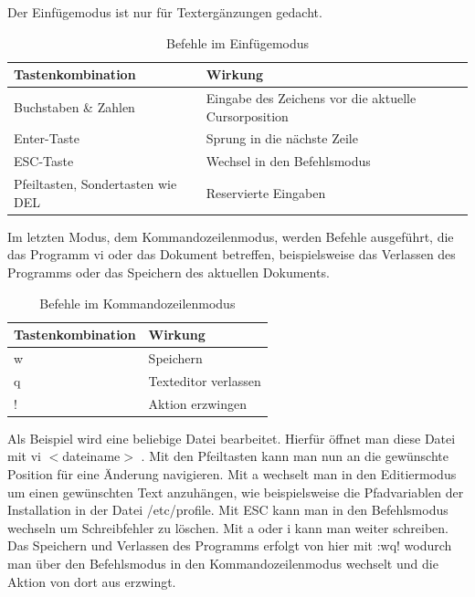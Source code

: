 \documentclass[12pt,a4paper]{article}
\begin{document}
Der Einfügemodus ist nur für Textergänzungen gedacht.

\begin{table} [H]
	\caption{Befehle im Einfügemodus}
	\label{tab:vi_einfuegemodus}
	\begin{tabularx}{\textwidth}{ | l | X | } 
		\hline
		Tastenkombination & Wirkung \\
		\hline \hline
		Buchstaben \& Zahlen & Eingabe des Zeichens vor die aktuelle Cursorposition \\ \hline
		Enter-Taste & Sprung in die nächste Zeile \\ \hline
		ESC-Taste & Wechsel in den Befehlsmodus \\ \hline
		Pfeiltasten, Sondertasten wie DEL & Reservierte Eingaben \\ \hline	
	\end{tabularx}
\end{table}

Im letzten Modus, dem Kommandozeilenmodus, werden Befehle ausgeführt, die das Programm vi oder das Dokument betreffen, beispielsweise das Verlassen des Programms oder das Speichern des aktuellen Dokuments.

\begin{table} [H]
	\caption{Befehle im Kommandozeilenmodus}
	\label{tab:vi_kommandozeilenmodus}
	\begin{tabularx}{\textwidth}{ | l | X | } 
		\hline
		Tastenkombination & Wirkung \\
		\hline \hline
		w & Speichern \\ \hline
		q & Texteditor verlassen \\ \hline
		! & Aktion erzwingen \\ \hline	
	\end{tabularx}
\end{table}

Als Beispiel wird eine beliebige Datei bearbeitet. Hierfür öffnet man diese Datei mit \glqq vi $<$dateiname$>$ \glqq{}. Mit den Pfeiltasten kann man nun an die gewünschte Position für eine Änderung navigieren. Mit \glqq a\grqq{} wechselt man in den Editiermodus um einen gewünschten Text anzuhängen, wie beispielsweise die Pfadvariablen der Installation in der Datei /etc/profile. Mit ESC kann man in den Befehlsmodus wechseln um Schreibfehler zu löschen. Mit \glqq a\grqq{} oder \glqq i\grqq{} kann man weiter schreiben. Das Speichern und Verlassen des Programms erfolgt von hier mit \glqq :wq!\grqq{} wodurch man über den Befehlsmodus in den Kommandozeilenmodus wechselt und die Aktion von dort aus erzwingt. 
\end{document}
